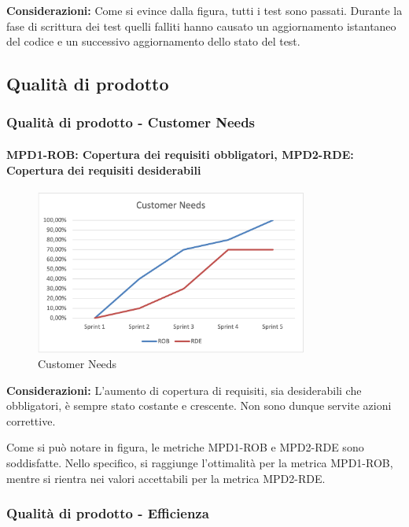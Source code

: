 \noindent \textbf{Considerazioni:} Come si evince dalla figura, tutti i test sono passati. Durante la fase di scrittura dei test quelli falliti hanno causato un aggiornamento istantaneo del codice e un successivo aggiornamento dello stato del test. 

\subsection{Qualità di prodotto}

\subsubsection{Qualità di prodotto - Customer Needs}

\paragraph{MPD1-ROB: Copertura dei requisiti obbligatori,  MPD2-RDE: Copertura dei requisiti desiderabili}
\begin{figure}[H] 
    \centering
    \includegraphics[width=0.8\textwidth]{images/Customer Needs.png}
    \caption{Customer Needs}
\end{figure}

\noindent \textbf{Considerazioni:} L'aumento di copertura di requisiti, sia desiderabili che obbligatori, è sempre stato costante e crescente. Non sono dunque servite azioni correttive.

Come si può notare in figura, le metriche MPD1-ROB e MPD2-RDE sono soddisfatte. Nello specifico, si raggiunge l'ottimalità per la metrica MPD1-ROB, mentre si rientra nei valori accettabili per la metrica MPD2-RDE.

\subsubsection{Qualità di prodotto - Efficienza}

